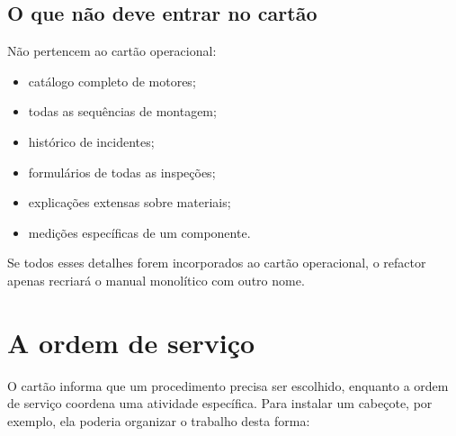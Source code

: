 \documentclass[
  10pt,
  a4paper,
  oneside]{book}
\providecommand{\tightlist}{%
  \setlength{\itemsep}{0pt}\setlength{\parskip}{0pt}}
\begin{document}
\hypertarget{o-que-nuxe3o-deve-entrar-no-cartuxe3o}{%
\subsection{O que não deve entrar no
cartão}\label{o-que-nuxe3o-deve-entrar-no-cartuxe3o}}

Não pertencem ao cartão operacional:

\begin{itemize}
\tightlist
\item
  catálogo completo de motores;
\item
  todas as sequências de montagem;
\item
  histórico de incidentes;
\item
  formulários de todas as inspeções;
\item
  explicações extensas sobre materiais;
\item
  medições específicas de um componente.
\end{itemize}

Se todos esses detalhes forem incorporados ao cartão operacional, o
refactor apenas recriará o manual monolítico com outro nome.

\hypertarget{a-ordem-de-serviuxe7o}{%
\section{A ordem de serviço}\label{a-ordem-de-serviuxe7o}}

O cartão informa que um procedimento precisa ser escolhido, enquanto a
ordem de serviço coordena uma atividade específica. Para instalar um
cabeçote, por exemplo, ela poderia organizar o trabalho desta forma:
\end{document}
